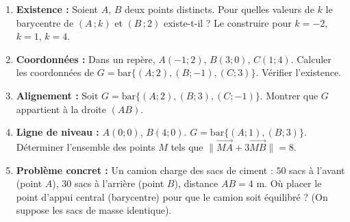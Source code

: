 \documentclass[11pt]{article}
\begin{document}
\begin{exercice}
\begin{enumerate}
\item \textbf{Existence :} Soient $A$, $B$ deux points distincts. Pour quelles valeurs de $k$ le barycentre de $(A\,;k)$ et $(B\,;2)$ existe-t-il ? Le construire pour $k=-2$, $k=1$, $k=4$.
\item \textbf{Coordonnées :} Dans un repère, $A(-1;2)$, $B(3;0)$, $C(1;4)$. Calculer les coordonnées de $G = \mathrm{bar}\{(A;2), (B;-1), (C;3)\}$. Vérifier l'existence.
\item \textbf{Alignement :} Soit $G = \mathrm{bar}\{(A;2), (B;3), (C;-1)\}$. Montrer que $G$ appartient à la droite $(AB)$.
\item \textbf{Ligne de niveau :} $A(0;0)$, $B(4;0)$. $G = \mathrm{bar}\{(A;1), (B;3)\}$. Déterminer l'ensemble des points $M$ tels que $\|\overrightarrow{MA} + 3\overrightarrow{MB}\| = 8$.
\item \textbf{Problème concret :} Un camion charge des sacs de ciment : $50$ sacs à l'avant (point $A$), $30$ sacs à l'arrière (point $B$), distance $AB = 4$ m. Où placer le point d'appui central (barycentre) pour que le camion soit équilibré ? (On suppose les sacs de masse identique).
\end{enumerate}
\end{exercice}
\end{document}
